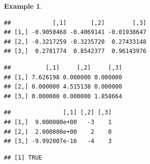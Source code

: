 \documentclass[
]{book}
\newenvironment{Shaded}{\begin{snugshade}}{\end{snugshade}}
\newcommand{\KeywordTok}[1]{\textcolor[rgb]{0.13,0.29,0.53}{\textbf{#1}}}
\newcommand{\NormalTok}[1]{#1}
\newcommand{\OperatorTok}[1]{\textcolor[rgb]{0.81,0.36,0.00}{\textbf{#1}}}
\newcommand{\StringTok}[1]{\textcolor[rgb]{0.31,0.60,0.02}{#1}}
\theoremstyle{definition}
\theoremstyle{definition}
\newtheorem{example}{Example}[chapter]
\theoremstyle{definition}
\theoremstyle{remark}
\begin{document}
\begin{example}
\begin{Shaded}
\end{Shaded}

\begin{verbatim}
##            [,1]       [,2]        [,3]
## [1,] -0.9050468 -0.4069141 -0.01938647
## [2,] -0.3217259 -0.3235720  0.27433148
## [3,]  0.2781774  0.8542377  0.96143976
\end{verbatim}

\begin{Shaded}
\end{Shaded}

\begin{verbatim}
##          [,1]     [,2]     [,3]
## [1,] 7.626198 0.000000 0.000000
## [2,] 0.000000 4.515138 0.000000
## [3,] 0.000000 0.000000 1.858664
\end{verbatim}

\begin{Shaded}
\end{Shaded}

\begin{verbatim}
##               [,1] [,2] [,3]
## [1,]  9.000000e+00   -3    1
## [2,]  2.000000e+00    2    0
## [3,] -9.992007e-16   -4    3
\end{verbatim}

\begin{Shaded}
\end{Shaded}

\begin{verbatim}
## [1] TRUE
\end{verbatim}

\end{example}
\end{document}

